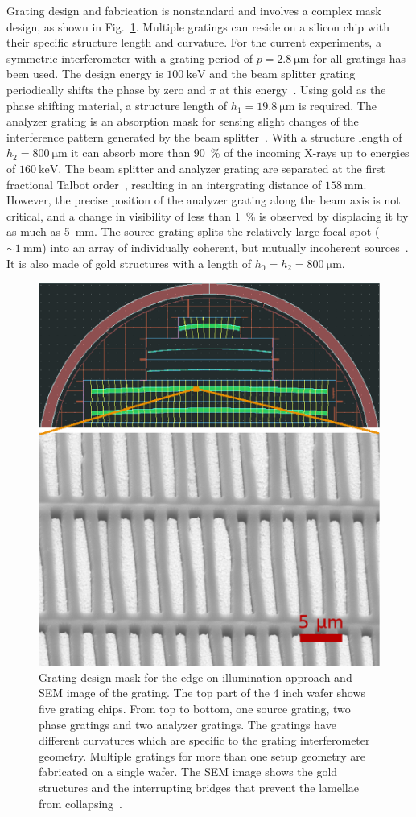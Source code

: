 \documentclass[english]{nature}
\begin{document}
Grating design and fabrication is nonstandard and involves a complex mask
design, as shown in Fig.~\ref{Fig:grating_mask}. Multiple gratings can reside on a
silicon chip with their specific structure length and curvature. For the
current experiments, a symmetric interferometer with a grating period of $p
= \SI{2.8}{\micro\metre}$ for all gratings has been used. The design energy
is $\SI{100}{\kilo\electronvolt}$ and the beam splitter grating periodically
shifts the phase by zero and $\pi$ at this energy~\cite{David2002}. Using
gold as the phase shifting material, a structure length of
$h_1 = \SI{19.8}{\micro \metre}$ is required. The analyzer grating is an absorption mask
for sensing slight changes of the interference pattern generated by the beam
splitter~\cite{Momose2003a}. With a structure length of $h_2 =
\SI{800}{\micro \metre}$
it can absorb more than \SI{90}{\percent} of the incoming X-rays up to energies of 
$\SI{160}{\kilo\electronvolt}$. The beam splitter and analyzer grating are
separated at the first fractional Talbot order~\cite{Weitkamp2005},
resulting in an intergrating distance of $\SI{158}{\milli\metre}$. However,
the precise position of the analyzer grating along the beam axis is not
critical, and a change in visibility of less than \SI{1}{\percent} is
observed by displacing it by as much as \SI{5}{\milli\metre}. The
source grating splits the relatively large focal spot ($\sim
\SI{1}{\milli\metre}$) into an array of individually coherent, but mutually
incoherent sources~\cite{Pfeiffer2006}. It is also made of gold structures
with a length of $h_0 = h_2 = \SI{800}{\micro \metre}$.
\begin{figure}[h!]
    \centering
    \includegraphics[width=.6\textwidth]{figures/grating_mask.eps}
    \caption{Grating design mask for
        the edge-on illumination approach and \ac{SEM}
        image of the grating. The top part of the 4 inch wafer shows
        five grating chips. From top to bottom, one source grating, two
        phase gratings and two analyzer gratings. The
        gratings have different curvatures which are specific to the grating
        interferometer geometry. Multiple gratings for more than one setup
        geometry are fabricated on a single wafer.
        The \ac{SEM} image shows the gold structures and the interrupting bridges
        that prevent the lamellae from collapsing~\cite{Kenntner2010}.}\label{Fig:grating_mask}
\end{figure}
\end{document}
